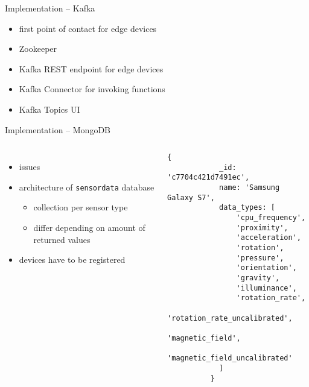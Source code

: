\documentclass[aspectratio=169]{beamer}
\begin{document}
  \begin{frame}{Implementation -- Kafka}
    \begin{itemize}
      \item first point of contact for edge devices
      \item Zookeeper
      \item Kafka REST endpoint for edge devices
      \item Kafka Connector for invoking functions
      \item Kafka Topics UI
    \end{itemize}
  \end{frame}

  \begin{frame}[fragile]{Implementation -- MongoDB}
    \begin{columns}
        \begin{itemize}
          \item issues
          \item architecture of \texttt{sensordata} database
            \begin{itemize}
              \item collection per sensor type
              \item differ depending on amount of returned values
            \end{itemize}
          \item devices have to be registered
        \end{itemize}
          \begin{lstlisting}[language=mongo, basicstyle=\scriptsize\ttfamily]
          {
            _id: 'c7704c421d7491ec',
            name: 'Samsung Galaxy S7',
            data_types: [
                'cpu_frequency',
                'proximity',
                'acceleration',
                'rotation',
                'pressure',
                'orientation',
                'gravity',
                'illuminance',
                'rotation_rate',
                'rotation_rate_uncalibrated',
                'magnetic_field',
                'magnetic_field_uncalibrated'
            ]
          }
          \end{lstlisting}
     \end{columns}
  \end{frame}
\end{document}
